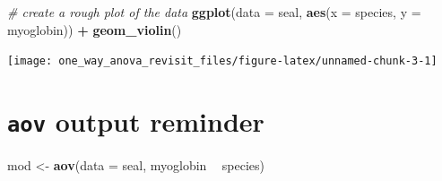 \documentclass[
]{book}
\newenvironment{Shaded}{\begin{snugshade}}{\end{snugshade}}
\newcommand{\CommentTok}[1]{\textcolor[rgb]{0.56,0.35,0.01}{\textit{#1}}}
\newcommand{\DataTypeTok}[1]{\textcolor[rgb]{0.13,0.29,0.53}{#1}}
\newcommand{\KeywordTok}[1]{\textcolor[rgb]{0.13,0.29,0.53}{\textbf{#1}}}
\newcommand{\NormalTok}[1]{#1}
\newcommand{\OperatorTok}[1]{\textcolor[rgb]{0.81,0.36,0.00}{\textbf{#1}}}
\newcommand{\StringTok}[1]{\textcolor[rgb]{0.31,0.60,0.02}{#1}}
\begin{document}
\begin{Shaded}
\end{Shaded}

\begin{Shaded}
\begin{Highlighting}[]
\CommentTok{# create a rough plot of the data  }
\KeywordTok{ggplot}\NormalTok{(}\DataTypeTok{data =}\NormalTok{ seal, }\KeywordTok{aes}\NormalTok{(}\DataTypeTok{x =}\NormalTok{ species, }\DataTypeTok{y =}\NormalTok{ myoglobin)) }\OperatorTok{+}
\StringTok{  }\KeywordTok{geom_violin}\NormalTok{()}
\end{Highlighting}
\end{Shaded}

\begin{flushleft}\texttt{[image: one\_way\_anova\_revisit\_files/figure-latex/unnamed-chunk-3-1]} \end{flushleft}

\begin{Shaded}
\end{Shaded}

\hypertarget{aov-output-reminder}{%
\section{\texorpdfstring{\texttt{aov} output reminder}{aov output reminder}}\label{aov-output-reminder}}

\begin{Shaded}
\begin{Highlighting}[]
\NormalTok{mod <-}\StringTok{ }\KeywordTok{aov}\NormalTok{(}\DataTypeTok{data =}\NormalTok{ seal, myoglobin }\OperatorTok{~}\StringTok{ }\NormalTok{species)}
\end{Highlighting}
\end{Shaded}
\end{document}
